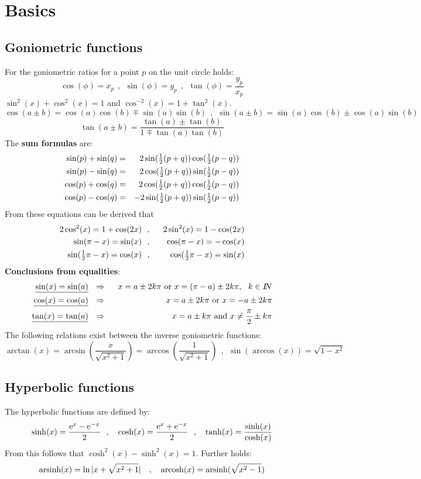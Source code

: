 \documentclass[twoside]{report}
\begin{document}
\chapter{Basics}
\section{Goniometric functions}
For the goniometric ratios for a point $p$ on the unit circle holds:
\[
\cos(\phi)=x_p~~,~~\sin(\phi)=y_p~~,~~\tan(\phi)=\frac{y_p}{x_p}
\]
$\sin^2(x)+\cos^2(x)=1$ and $\cos^{-2}(x)=1+\tan^2(x)$.
\[
\cos(a\pm b)=\cos(a)\cos(b)\mp\sin(a)\sin(b)~~,~~
\sin(a\pm b)=\sin(a)\cos(b)\pm\cos(a)\sin(b)
\]
\[
\tan(a\pm b)=\frac{\tan(a)\pm\tan(b)}{1\mp\tan(a)\tan(b)}
\]
The {\bf sum formulas} are:
\begin{eqnarray*}
\sin(p)+\sin(q)&=&2\sin(\mbox{$\frac{1}{2}$}(p+q))\cos(\mbox{$\frac{1}{2}$}(p-q))\\
\sin(p)-\sin(q)&=&2\cos(\mbox{$\frac{1}{2}$}(p+q))\sin(\mbox{$\frac{1}{2}$}(p-q))\\
\cos(p)+\cos(q)&=&2\cos(\mbox{$\frac{1}{2}$}(p+q))\cos(\mbox{$\frac{1}{2}$}(p-q))\\
\cos(p)-\cos(q)&=&-2\sin(\mbox{$\frac{1}{2}$}(p+q))\sin(\mbox{$\frac{1}{2}$}(p-q))\\
\end{eqnarray*}
From these equations can be derived that
\begin{eqnarray*}
2\cos^2(x)=1+\cos(2x)   &~~,~~&2\sin^2(x)=1-\cos(2x)\\
\sin(\pi-x)=\sin(x)     &~~,~~&\cos(\pi-x)=-\cos(x)\\
\sin(\mbox{$\frac{1}{2}$}\pi-x)=\cos(x)&~~,~~&\cos(\mbox{$\frac{1}{2}$}\pi-x)=\sin(x)
\end{eqnarray*}
{\bf Conclusions from equalities}:
\begin{eqnarray*}
\underline{\sin(x)=\sin(a)}&~~\Rightarrow~~&x=a\pm2k\pi\mbox{ or }x=(\pi-a)\pm2k\pi,~~k\in I\hspace{-1mm}N\\
\underline{\cos(x)=\cos(a)}&~~\Rightarrow~~&x=a\pm2k\pi\mbox{ or }x=-a\pm2k\pi\\
\underline{\tan(x)=\tan(a)}&~~\Rightarrow~~&x=a\pm k\pi\mbox{ and }x\neq\frac{\pi}{2}\pm k\pi
\end{eqnarray*}
The following relations exist between the inverse goniometric functions:
\[
\arctan(x)=\arcsin\left(\frac{x}{\sqrt{x^2+1}}\right)=\arccos\left(\frac{1}{\sqrt{x^2+1}}\right)~~,~~
\sin(\arccos(x))=\sqrt{1-x^2}
\]

\section{Hyperbolic functions}
The hyperbolic functions are defined by:
\[
\sinh(x)=\frac{{\rm e}^x-{\rm e}^{-x}}{2}~~,~~~\cosh(x)=\frac{{\rm e}^x+{\rm e}^{-x}}{2}~~,~~~\tanh(x)=\frac{\sinh(x)}{\cosh(x)}
\]
From this follows that $\cosh^2(x)-\sinh^2(x)=1$. Further holds:
\[
{\rm arsinh}(x)=\ln|x+\sqrt{x^2+1}|~~~,~~~{\rm arcosh}(x)={\rm arsinh}(\sqrt{x^2-1})
\]
\end{document}
